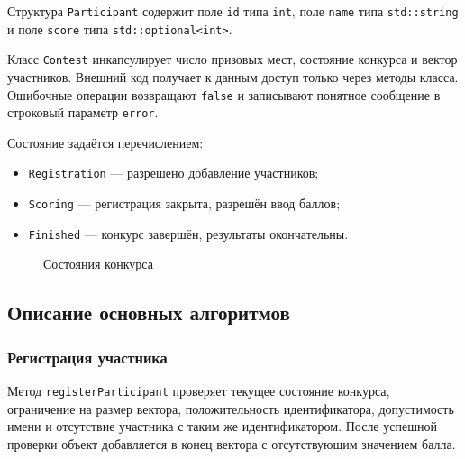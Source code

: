 \documentclass[14pt,a4paper]{extarticle}
\newcommand{\code}[1]{\texttt{#1}}
\begin{document}
Структура \code{Participant} содержит поле \code{id} типа \code{int}, поле \code{name} типа \code{std::string} и поле \code{score} типа \code{std::optional<int>}.

Класс \code{Contest} инкапсулирует число призовых мест, состояние конкурса и вектор участников. Внешний код получает к данным доступ только через методы класса. Ошибочные операции возвращают \code{false} и записывают понятное сообщение в строковый параметр \code{error}.

Состояние задаётся перечислением:
\begin{itemize}
\item \code{Registration} --- разрешено добавление участников;
\item \code{Scoring} --- регистрация закрыта, разрешён ввод баллов;
\item \code{Finished} --- конкурс завершён, результаты окончательны.
\end{itemize}

\begin{figure}[H]
\centering
{}
\caption{Состояния конкурса}
\label{fig:states}
\end{figure}

\subsection{Описание основных алгоритмов}

\subsubsection{Регистрация участника}

Метод \code{registerParticipant} проверяет текущее состояние конкурса, ограничение на размер вектора, положительность идентификатора, допустимость имени и отсутствие участника с таким же идентификатором. После успешной проверки объект добавляется в конец вектора с отсутствующим значением балла.
\end{document}
